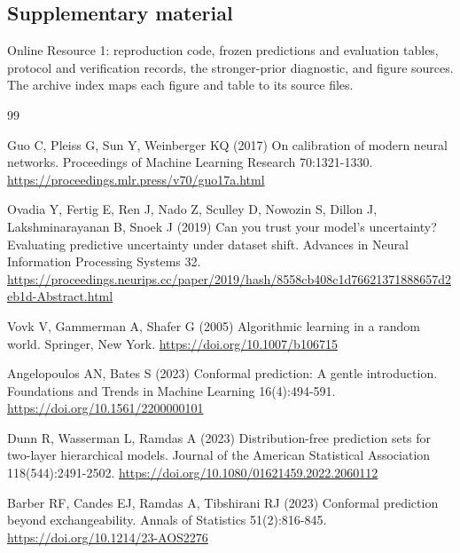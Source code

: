 \documentclass[pdflatex,sn-basic,Numbered,iicol]{sn-jnl}
\begin{document}
\subsection*{Supplementary material}
Online Resource 1: reproduction code, frozen predictions and evaluation tables, protocol and verification records, the stronger-prior diagnostic, and figure sources. The archive index maps each figure and table to its source files.


\begin{thebibliography}{99}\fontsize{9}{11}\selectfont\setlength{\itemsep}{2pt}
\begin{minipage}[t]{\linewidth}Guo C, Pleiss G, Sun Y, Weinberger KQ (2017) On calibration of modern neural networks. Proceedings of Machine Learning Research 70:1321-1330. \url{https://proceedings.mlr.press/v70/guo17a.html}\end{minipage}

\begin{minipage}[t]{\linewidth}Ovadia Y, Fertig E, Ren J, Nado Z, Sculley D, Nowozin S, Dillon J, Lakshminarayanan B, Snoek J (2019) Can you trust your model's uncertainty? Evaluating predictive uncertainty under dataset shift. Advances in Neural Information Processing Systems 32. \url{https://proceedings.neurips.cc/paper/2019/hash/8558cb408c1d76621371888657d2eb1d-Abstract.html}\end{minipage}

\begin{minipage}[t]{\linewidth}Vovk V, Gammerman A, Shafer G (2005) Algorithmic learning in a random world. Springer, New York. \url{https://doi.org/10.1007/b106715}\end{minipage}

\begin{minipage}[t]{\linewidth}Angelopoulos AN, Bates S (2023) Conformal prediction: A gentle introduction. Foundations and Trends in Machine Learning 16(4):494-591. \url{https://doi.org/10.1561/2200000101}\end{minipage}

\begin{minipage}[t]{\linewidth}Dunn R, Wasserman L, Ramdas A (2023) Distribution-free prediction sets for two-layer hierarchical models. Journal of the American Statistical Association 118(544):2491-2502. \url{https://doi.org/10.1080/01621459.2022.2060112}\end{minipage}

\begin{minipage}[t]{\linewidth}Barber RF, Candes EJ, Ramdas A, Tibshirani RJ (2023) Conformal prediction beyond exchangeability. Annals of Statistics 51(2):816-845. \url{https://doi.org/10.1214/23-AOS2276}\end{minipage}


\end{thebibliography}
\end{document}

